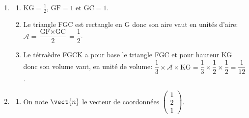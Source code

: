 \begin{enumerate}
$\vectt{CF}$ et $\vectt{CK}$ ont pour coordonnées respectives
$\begin{pmatrix}
x_{\text F}-x_{\text C} \\ y_{\text F}-y_{\text C} \\ z_{\text F}-z_{\text C} 
\end{pmatrix}
=
\begin{pmatrix}
-1 \\ 0 \\ 1
\end{pmatrix}$
et
$\begin{pmatrix}
x_{\text K}-x_{\text C} \\ y_{\text K}-y_{\text C} \\ z_{\text K}-z_{\text C} 
\end{pmatrix}
=
\begin{pmatrix}
0 \\ -\frac{1}{2} \\ 1
\end{pmatrix}$.

Donc les vecteurs $\vectt{CF}$ et $\vectt{CK}$ ne sont pas colinéaires donc les points C, F et K ne sont pas alignés, et donc ces trois points définissent un plan.

\item 
	\begin{enumerate}
		\item $\text{KG}=\frac{1}{2}$, $\text{GF}=1$ et $\text{GC}=1$.
		\item Le triangle FGC est rectangle en G donc son aire vaut en unités d'aire:\\
		$\mathcal{A}=\dfrac{\text{GF}\times\text{GC}}{2}=\dfrac{1}{2}$.
		\item Le tétraèdre FGCK a pour base le triangle FGC et pour hauteur KG donc son volume vaut, en unité de volume:	
		$\dfrac{1}{3}\times \mathcal{A}\times \text{KG}=\dfrac{1}{3}\times \dfrac{1}{2}\times\dfrac{1}{2}=\dfrac{1}{12}$.
	\end{enumerate}

\item 
	\begin{enumerate}
		\item On note $\vect{n}$ le vecteur de coordonnées $\begin{pmatrix}1\\2\\1\end{pmatrix}$.
		


\end{enumerate}
\end{enumerate}
